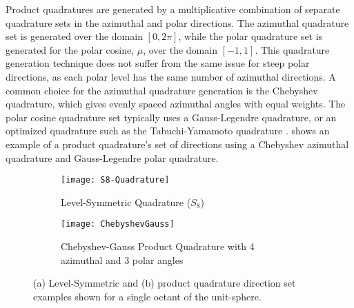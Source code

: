 {{{{                Product quadratures are generated by a multiplicative combination of separate quadrature sets in the azimuthal and polar directions.
                The azimuthal quadrature set is generated over the domain $[0,2\pi]$, while the polar quadrature set is generated for the polar cosine, $\mu$, over the domain $[-1,1]$.
                This quadrature generation technique does not suffer from the same issue for steep polar directions, as each polar level has the same number of azimuthal directions.
                A common choice for the azimuthal quadrature generation is the Chebyshev quadrature, which gives evenly spaced azimuthal angles with equal weights.
                The polar cosine quadrature set typically uses a Gauss-Legendre quadrature, or an optimized quadrature such as the Tabuchi-Yamamoto quadrature \cite{TabuchiYamamotoQuad}.
                 shows an example of a product quadrature's set of directions using a Chebyshev azimuthal quadrature and Gauss-Legendre polar quadrature.

                \begin{figure}[h]
                    \centering
                    \begin{subfigure}[t]{0.45\linewidth}
                        \centering
                        \texttt{[image: S8-Quadrature]}
                        \caption{Level-Symmetric Quadrature ($S_8$)}
                        \label{fig:NTT:S8 Quadrature}
                    \end{subfigure}%
                    \hfill
                    \begin{subfigure}[t]{0.45\linewidth}
                        \centering
                        \texttt{[image: ChebyshevGauss]}
                        \caption{Chebyshev-Gauss Product Quadrature with 4 azimuthal and 3 polar angles}
                        \label{fig:NTT:ChebyshevGauss Quadrature}
                    \end{subfigure}
                    \caption{(a) Level-Symmetric and (b) product quadrature direction set examples shown for a single octant of the unit-sphere.}
                    \label{fig:NTT:Quadrature Examples}
                \end{figure}
            }
        }
    }
}
